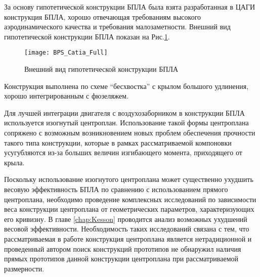 



За основу гипотетической конструкции БПЛА была взята разработанная в ЦАГИ конструкция БПЛА, хорошо отвечающая требованиям высокого аэродинамического качества и требования малозаметности. Внешний вид гипотетической конструкции БПЛА показан на Рис.\ref{fig:BPLA_TSAGI}.
 

  
  



\begin{figure}[ht]
\centering
\texttt{[image: BPS\_Catia\_Full]}
\caption{Внешний вид гипотетической конструкции БПЛА}
\label{fig:BPLA_TSAGI}
\end{figure}

Конструкция выполнена по схеме ``бесхвостка'' с крылом большого удлинения, хорошо интегрированным с фюзеляжем. 

Для лучшей интеграции двигателя с воздухозаборником в конструкции БПЛА используется изогнутый центроплан. Использование такой формы центроплана сопряжено с возможным возникновением новых проблем обеспечения прочности такого типа конструкции, которые в рамках рассматриваемой компоновки усугубляются из-за больших величин изгибающего момента, приходящего от крыла. 

Поскольку использование изогнутого центроплана может существенно ухудшить весовую эффективность БПЛА по сравнению с использованием прямого центроплана, необходимо проведение комплексных исследований по зависимости веса конструкции центроплана от геометрических параметров, характеризующих его кривизну. В главе \ref{chap:Kesson} проводится анализ возможных ухудшений весовой эффективности. 
Необходимость таких исследований связана с тем, что рассматриваемая в работе конструкция центроплана является нетрадиционной и проведенный автором поиск конструкций прототипов не обнаружил наличия прямых прототипов данной конструкции центроплана при рассматриваемой размерности.

 
